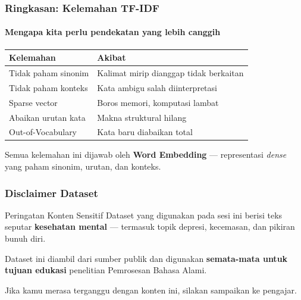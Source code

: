 \documentclass[t,aspectratio=169,xcolor=dvipsnames]{beamer}
\begin{document}
\begin{frame}
    \frametitle{Ringkasan: Kelemahan TF-IDF}
    \framesubtitle{Mengapa kita perlu pendekatan yang lebih canggih}
    \small
    \begin{center}
    \begin{tabular}{ll}
        \toprule
        \textbf{Kelemahan} & \textbf{Akibat} \\
        \midrule
        Tidak paham sinonim   & Kalimat mirip dianggap tidak berkaitan \\
        Tidak paham konteks   & Kata ambigu salah diinterpretasi \\
        Sparse vector         & Boros memori, komputasi lambat \\
        Abaikan urutan kata   & Makna struktural hilang \\
        Out-of-Vocabulary     & Kata baru diabaikan total \\
        \bottomrule
    \end{tabular}
    \end{center}
    \vspace{0.5em}
    \begin{tcolorbox}[colback=nyublue!10, colframe=nyublue, boxrule=0.8mm, arc=2mm, halign=center]
        Semua kelemahan ini dijawab oleh \textbf{Word Embedding} ---
        representasi \textit{dense} yang paham sinonim, urutan, dan konteks.
    \end{tcolorbox}
\end{frame}

\begin{frame}
    \frametitle{Disclaimer Dataset}
    \begin{alertblock}{Peringatan Konten Sensitif}
        Dataset yang digunakan pada sesi ini berisi teks seputar \textbf{kesehatan mental} — termasuk topik depresi, kecemasan, dan pikiran bunuh diri.
        \vspace{0.25em}

        Dataset ini diambil dari sumber publik dan digunakan \textbf{semata-mata untuk tujuan edukasi} penelitian Pemrosesan Bahasa Alami.
        \vspace{0.25em}

        Jika kamu merasa terganggu dengan konten ini, silakan sampaikan ke pengajar.
    \end{alertblock}
\end{frame}

\end{document}
